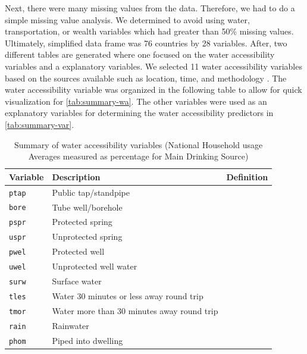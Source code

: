 \documentclass[10pt,twoside]{article}
\numberwithin{equation}{section}
\newcommand{\?}{\stackrel{?}{=}}
\begin{document}
Next, there were many missing values from the data. Therefore, we had to do a simple missing value analysis. We determined to avoid using water, transportation, or wealth variables which had greater than 50\% missing values. Ultimately, simplified data frame was 76 countries by 28 variables. After, two different tables are generated where one focused on the water accessibility variables and a explanatory variables. We selected 11 water accessibility variables based on the sources available such as location, time, and methodology \citep{price2019difference}. The water accessibility variable was organized
in the following table to allow for quick visualization for \autoref{tab:summary-wa}. The other variables were used as an explanatory variables for determining the water accessibility predictors in \autoref{tab:summary-var}. 
\begin{table}[h!]
  \centering
  \begin{tabular}{p{1in} p{3in} p{2in}}\toprule
    \bf Variable & \bf Description & \bf Definition \\\midrule
    \texttt{ptap} &  Public tap/standpipe
 & 
 \\\midrule
 \texttt{bore} & Tube well/borehole & 
\\\midrule
\texttt{pspr} & Protected spring
& 
\\\midrule
\texttt{uspr} & Unprotected spring
& 
\\\midrule
\texttt{pwel} & Protected well
& 
\\\midrule
\texttt{uwel} & Unprotected well water
&
\\\midrule
\texttt{surw} & Surface water
& 
\\\midrule
\texttt{tles} & Water 30 minutes or less away round trip
&
\\\midrule 
\texttt{tmor} & Water more than 30 minutes away round trip & 
\\\midrule
\texttt{rain} & Rainwater
& 
\\\midrule
\texttt{phom} & Piped into dwelling

 \\\bottomrule
  \end{tabular}
  \caption{Summary of water accessibility variables (National Household usage Averages measured as percentage for Main Drinking Source)}
  \label{tab:summary-wa}
\end{table}
\end{document}
